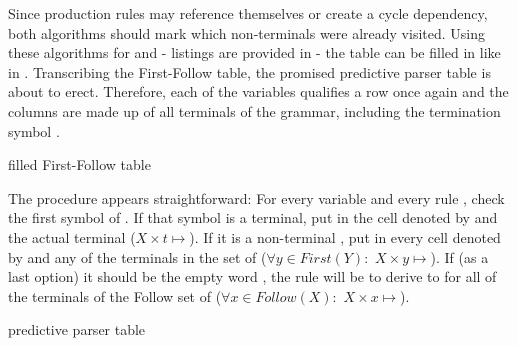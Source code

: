 Since production rules may reference themselves or create a cycle dependency, both algorithms should mark which non-terminals were already visited. Using these algorithms for  and  -  listings are provided in  - the table can be filled in like in . Transcribing the First-Follow table, the promised predictive \textlang{} parser table is about to erect. Therefore, each of the variables qualifies a row once again and the columns are made up of all terminals of the grammar, including the termination symbol \textterminal{}.

\begin{table}
	\centering
	\caption{filled First-Follow table}
	\label{tab:example_firstFollow_filled}
	
	
\end{table}

\FloatBarrier

The procedure appears straightforward: For every variable  and every rule , check the first symbol of . If that symbol is a terminal, put  in the cell denoted by  and the actual terminal ($X \times t \mapsto $). If it is a non-terminal , put  in every cell denoted by  and any of the terminals in the  set of  ($\forall y\in First(Y):$ $X \times y \mapsto $). If (as a last option) it should be the empty word \textemptyword{}, the rule will be to derive  to \textemptyword{} for all of the terminals of the Follow set of  ($\forall x\in Follow(X):$ $X \times x \mapsto $).

\begin{table}[H]
	\caption{predictive parser table}
	\label{tab:parseTab_example}

	
\end{table}

